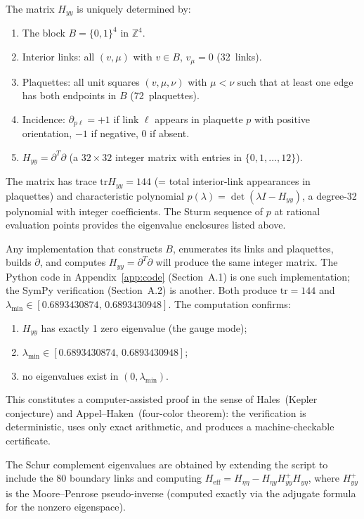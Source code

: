 \documentclass[11pt]{article}
\theoremstyle{definition}
\newcommand{\tr}{\mathrm{tr}}
\newcommand{\Z}{\mathbb{Z}}
\begin{document}
The matrix $H_{yy}$ is uniquely determined by:
\begin{enumerate}[nosep]
\item The block $B=\{0,1\}^4$ in $\Z^4$.
\item Interior links: all $(v,\mu)$ with $v\in B$, $v_\mu=0$
(32~links).
\item Plaquettes: all unit squares $(v,\mu,\nu)$ with
$\mu<\nu$ such that at least one edge has both endpoints
in $B$ (72~plaquettes).
\item Incidence: $\partial_{p\ell}=+1$ if link $\ell$ appears
in plaquette $p$ with positive orientation, $-1$ if negative,
$0$ if absent.
\item $H_{yy}=\partial^T\partial$ (a $32\times 32$ integer
matrix with entries in $\{0,1,\ldots,12\}$).
\end{enumerate}
The matrix has trace $\tr H_{yy}=144$ (= total interior-link
appearances in plaquettes) and characteristic polynomial
$p(\lambda)=\det(\lambda I-H_{yy})$, a degree-32 polynomial
with integer coefficients.  The Sturm sequence of $p$ at
rational evaluation points provides the eigenvalue
enclosures listed above.

Any implementation that constructs $B$, enumerates its
links and plaquettes, builds $\partial$, and computes
$H_{yy}=\partial^T\partial$ will produce the same integer
matrix.  The Python code in Appendix~\ref{app:code}
(Section~A.1) is one such implementation; the SymPy
verification (Section~A.2) is another.  Both produce
$\tr=144$ and $\lambda_{\min}\in[0.6893430874,\,0.6893430948]$.  The computation confirms:
\begin{enumerate}[nosep]
\item $H_{yy}$ has exactly 1 zero eigenvalue (the gauge mode);
\item $\lambda_{\min}\in[0.6893430874,\,0.6893430948]$;
\item no eigenvalues exist in $(0,\lambda_{\min})$.
\end{enumerate}
This constitutes a computer-assisted proof in the sense of
Hales~(Kepler conjecture) and Appel--Haken~(four-color theorem):
the verification is deterministic, uses only exact arithmetic, and
produces a machine-checkable certificate.

The Schur complement eigenvalues are obtained by extending the script
to include the 80 boundary links and computing
$H_{\mathrm{eff}}=H_{\eta\eta}-H_{\eta y}H_{yy}^+H_{y\eta}$,
where $H_{yy}^+$ is the Moore--Penrose pseudo-inverse (computed
exactly via the adjugate formula for the nonzero eigenspace).
\end{document}
